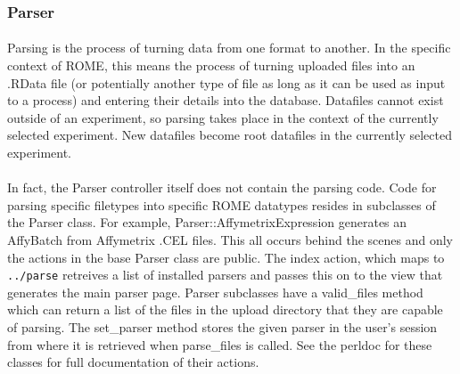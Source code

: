 \subsubsection{Parser}
\label{sec:controller_parser}

\paragraph{}
Parsing is the process of turning data from one format to another. In the specific context of ROME, this means the process of turning uploaded files into an .RData file (or potentially another type of file as long as it can be used as input to a process) and entering their details into the database. Datafiles cannot exist outside of an experiment, so parsing takes place in the context of the currently selected experiment. New datafiles become root datafiles in the currently selected experiment.

\paragraph*{}
In fact, the Parser controller itself does not contain the parsing code. Code for parsing specific filetypes into specific ROME datatypes resides in subclasses of the Parser class. For example, Parser::AffymetrixExpression generates an AffyBatch from Affymetrix .CEL files. This all occurs behind the scenes and only the actions in the base Parser class are public. The index action, which maps to \texttt{../parse} retreives a list of installed parsers and passes this on to the view that generates the main parser page. Parser subclasses have a valid\_files method which can return a list of the files in the upload directory that they are capable of parsing. The set\_parser method stores the given parser in the user's session from where it is retrieved when parse\_files is called. See the perldoc for these classes for full documentation of their actions.
% 







